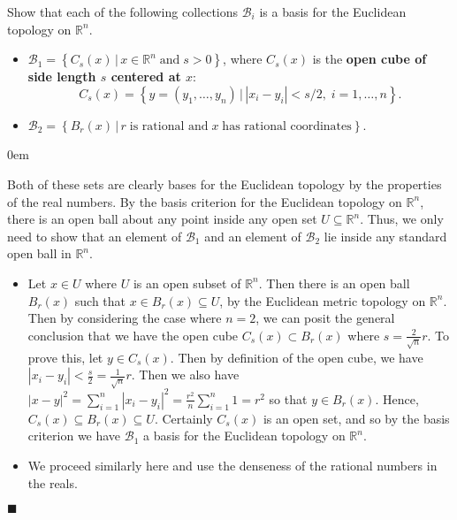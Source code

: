 \documentclass[12pt]{article}
\renewcommand{\qed}{\hfill$\blacksquare$}
\renewenvironment{proof}{\begin{addmargin}[1em]{0em}\begin{newproof}}{\end{newproof}\end{addmargin}\qed}
\newenvironment{exercise}[2][Exercise]{\begin{trivlist}
\item[\hskip \labelsep {\bfseries #1}\hskip \labelsep {\bfseries #2.}]}{\end{trivlist}}
\begin{document}
\begin{exercise}{2.42}
	Show that each of the following collections $\mathcal{B}_i$ is a basis for the Euclidean topology on $\mathbb{R}^n$.
	\begin{itemize}
		\item $\mathcal{B}_1 = \left\{ C_s\left(x\right) \, | \, x\in\mathbb{R}^n \; \text{and} \; s>0 \right\}$, where $C_s\left(x\right)$ is the \textbf{open cube of side length $s$ centered at $x$}: \[ C_s\left(x\right) = \left\{ y=\left(y_1,\ldots,y_n\right)\, | \, \left|x_i-y_i\right|<s/2, \; i=1,\ldots,n\right\}.\]
		\item $\mathcal{B}_2 = \left\{B_r\left(x\right) \, | \, r \; \text{is rational and} \; x \; \text{has rational coordinates}\right\}$.
	\end{itemize}
\end{exercise}
\begin{proof}
	Both of these sets are clearly bases for the Euclidean topology by the properties of the real numbers. By the basis criterion for the Euclidean topology on $\mathbb{R}^n$, there is an open ball about any point inside any open set $U\subseteq \mathbb{R}^n$. Thus, we only need to show that an element of $\mathcal{B}_1$ and an element of $\mathcal{B}_2$ lie inside any standard open ball in $\mathbb{R}^n$.
	\begin{itemize}
		\item Let $x \in U$ where $U$ is an open subset of $\mathbb{R}^n$. Then there is an open ball $B_r\left(x\right)$ such that $x\in B_r\left(x\right)\subseteq U$, by the Euclidean metric topology on $\mathbb{R}^n$. Then by considering the case where $n=2$, we can posit the general conclusion that we have the open cube $C_{s}\left(x\right) \subset B_r\left(x\right)$ where $s = \frac{2}{\sqrt{n}} r$. To prove this, let $y \in C_s\left(x\right)$. Then by definition of the open cube, we have $\left|x_i-y_i\right| < \frac{s}{2} = \frac{1}{\sqrt{n}}r$. Then we also have $\left|x-y\right|^2 = \sum_{i=1}^n \left|x_i-y_i\right|^2 = \frac{r^2}{n}\sum_{i=1}^n 1 = r^2$ so that $y \in B_r\left(x\right)$. Hence, $C_s\left(x\right)\subseteq B_r\left(x\right)\subseteq U$. Certainly $C_s\left(x\right)$ is an open set, and so by the basis criterion we have $\mathcal{B}_1$ a basis for the Euclidean topology on $\mathbb{R}^n$.

		\item We proceed similarly here and use the denseness of the rational numbers in the reals.

	\end{itemize}


\end{proof}
\end{document}
